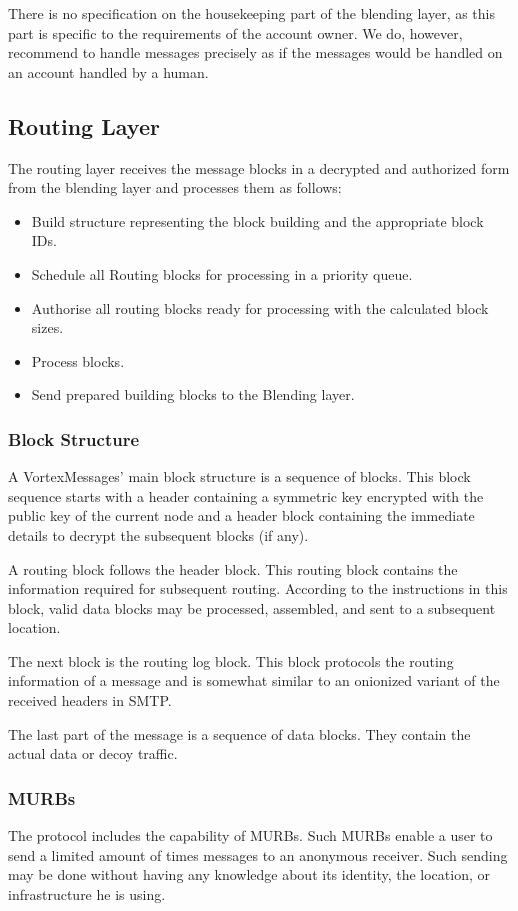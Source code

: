 There is no specification on the housekeeping part of the blending layer, as this part is specific to the requirements of the account owner. We do, however, recommend to handle messages precisely as if the messages would be handled on an account handled by a human. 

\subsection{Routing Layer\label{sec:routing}}
The routing layer receives the message blocks in a decrypted and authorized form from the blending layer and processes them as follows:

\begin{itemize}
	\item Build structure representing the block building and the appropriate block IDs.
	\item Schedule all Routing blocks for processing in a priority queue.
	\item Authorise all routing blocks ready for processing with the calculated block sizes.
	\item Process blocks.
	\item Send prepared building blocks to the Blending layer.
\end{itemize}

\subsubsection{Block Structure}
A VortexMessages' main block structure is a sequence of blocks. This block sequence starts with a header containing a symmetric key encrypted with the public key of the current node and a header block containing the immediate details to decrypt the subsequent blocks (if any).

A routing block follows the header block. This routing block contains the information required for subsequent routing. According to the instructions in this block, valid data blocks may be processed, assembled, and sent to a subsequent location. 

The next block is the routing log block. This block protocols the routing information of a message and is somewhat similar to an onionized variant of the received headers in SMTP.

The last part of the message is a sequence of data blocks. They contain the actual data or decoy traffic.

\subsubsection{MURBs\label{sec:murb}}
The protocol includes the capability of MURBs. Such MURBs enable a user to send a limited amount of times messages to an anonymous receiver. Such sending may be done without having any knowledge about its identity, the location, or infrastructure he is using.

